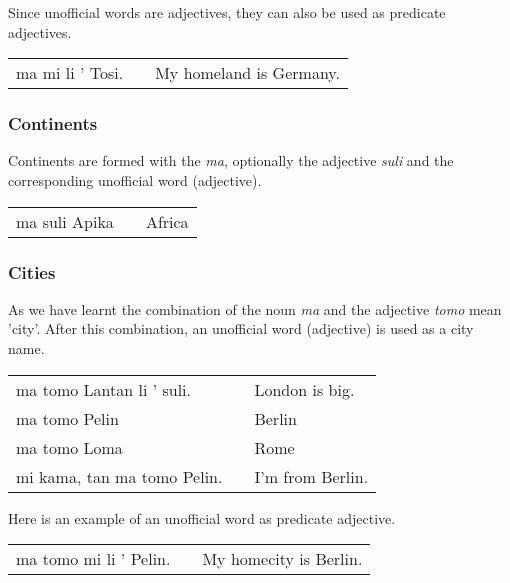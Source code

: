 Since unofficial words are adjectives, they can also be used as predicate adjectives.

\begin{supertabular}{p{5,5cm}|ll}
    ma mi li ' Tosi. &  & My homeland is Germany. \\
\end{supertabular}

%
\subsubsection*{Continents}
%
Continents are formed with the \textit{ma}, optionally the adjective \textit{suli} and the corresponding unofficial word (adjective).

\begin{supertabular}{p{2,5cm}|ll}
    ma suli Apika &  & Africa \\
\end{supertabular}

%
\subsubsection*{Cities}
%
As we have learnt the combination of the noun \textit{ma} and the adjective \textit{tomo} mean 'city'.
After this combination, an unofficial word (adjective) is used as a city name.

\begin{supertabular}{p{5,5cm}|ll}
    ma tomo Lantan li ' suli.   &  & London is big.   \\
    ma tomo Pelin               &  & Berlin           \\
    ma tomo Loma                &  & Rome             \\
    mi kama, tan ma tomo Pelin. &  & I'm from Berlin. \\
\end{supertabular}

Here is an example of an unofficial word as predicate adjective.

\begin{supertabular}{p{5,5cm}|ll}
    ma tomo mi li ' Pelin. &  & My homecity is Berlin. \\
\end{supertabular}

